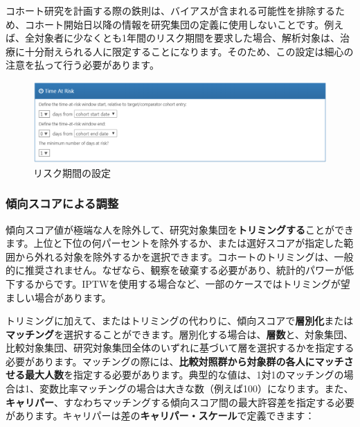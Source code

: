 \documentclass[
  11pt]{book}
\makeatletter
\newenvironment{kframe}{%
\medskip{}
\setlength{\fboxsep}{.8em}
 \def\at@end@of@kframe{}%
 \ifinner\ifhmode%
  \def\at@end@of@kframe{\end{minipage}}%
  \begin{minipage}{\columnwidth}%
 \fi\fi%
 \def\FrameCommand##1{\hskip\@totalleftmargin \hskip-\fboxsep
 \colorbox{myShadeColor}{##1}\hskip-\fboxsep
     \hskip-\linewidth \hskip-\@totalleftmargin \hskip\columnwidth}%
 \MakeFramed {\advance\hsize-\width
   \@totalleftmargin\z@ \linewidth\hsize
   \@setminipage}}%
 {\par\unskip\endMakeFramed%
 \at@end@of@kframe}
\newenvironment{rmdblock}[1]
  {
  \begin{itemize}
  \renewcommand{\labelitemi}{
    \raisebox{-.7\height}[0pt][0pt]{
      {\setkeys{Gin}{width=3em,keepaspectratio}\texttt{[image: images/\#1]}}
    }
  }
  \setlength{\fboxsep}{1em}
  \begin{kframe}
  \item
  }
  {
  \end{kframe}
  \end{itemize}
  }
\newenvironment{rmdimportant}
  {\begin{rmdblock}{important}}
  {\end{rmdblock}}
\theoremstyle{definition}
\theoremstyle{definition}
\theoremstyle{definition}
\theoremstyle{definition}
\theoremstyle{remark}
\makeatother
\begin{document}
\begin{rmdimportant}
コホート研究を計画する際の鉄則は、バイアスが含まれる可能性を排除するため、コホート開始日以降の情報を研究集団の定義に使用しないことです。例えば、全対象者に少なくとも1年間のリスク期間を要求した場合、解析対象は、治療に十分耐えられる人に限定することになります。そのため、この設定は細心の注意を払って行う必要があります。
\end{rmdimportant}

\begin{figure}

{\centering \includegraphics[width=1\linewidth]{images/PopulationLevelEstimation/timeAtRisk} 

}

\caption{リスク期間の設定}\label{fig:timeAtRisk}
\end{figure}

\subsubsection*{傾向スコアによる調整}\label{ux50beux5411ux30b9ux30b3ux30a2ux306bux3088ux308bux8abfux6574}

傾向スコア値が極端な人を除外して、研究対象集団を\textbf{トリミングする}ことができます。上位と下位の何パーセントを除外するか、または選好スコアが指定した範囲から外れる対象を除外するかを選択できます。コホートのトリミングは、一般的に推奨されません。なぜなら、観察を破棄する必要があり、統計的パワーが低下するからです。IPTWを使用する場合など、一部のケースではトリミングが望ましい場合があります。

トリミングに加えて、またはトリミングの代わりに、傾向スコアで\textbf{層別化}または\textbf{マッチング}を選択することができます。層別化する場合は、\textbf{層数}と、対象集団、比較対象集団、研究対象集団全体のいずれに基づいて層を選択するかを指定する必要があります。マッチングの際には、\textbf{比較対照群から対象群の各人にマッチさせる最大人数}を指定する必要があります。典型的な値は、1対1のマッチングの場合は1、変数比率マッチングの場合は大きな数（例えば100）になります。また、\textbf{キャリパー}、すなわちマッチングする傾向スコア間の最大許容差を指定する必要があります。キャリパーは差の\textbf{キャリパー・スケール}で定義できます：
\end{document}
